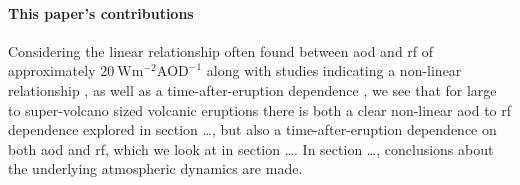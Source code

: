\documentclass{ametsocV5}
\begin{document}


%
%

\paragraph*{This paper's contributions}

Considering the linear relationship often found between \ac{aod} and \ac{rf} of
approximately \(\SI{20}{\watt\metre^{-2}\mathrm{AOD}^{-1}}\) \citep{gregory2016,
  marshall2020, mills2017, myhre2013} along with studies indicating a non-linear
relationship \citep{niemeier2015}, as well as a time-after-eruption dependence
\citep{marshall2020}, we see that for large to super-volcano sized volcanic eruptions
there is both a clear non-linear \ac{aod} to \ac{rf} dependence explored in section
\ldots, but also a time-after-eruption dependence on both \ac{aod} and \ac{rf}, which we
look at in section \ldots. In section \ldots, conclusions about the underlying
atmospheric dynamics are made.
\end{document}
